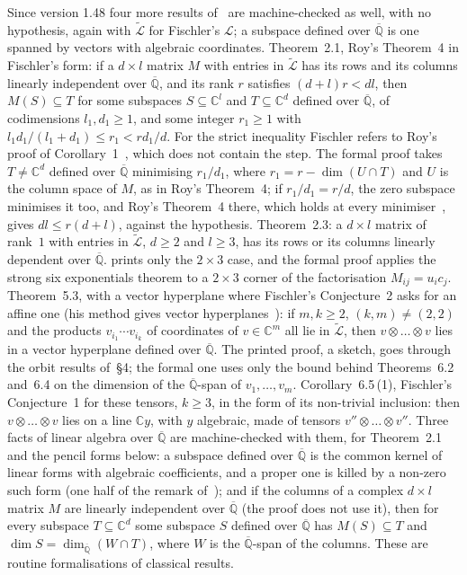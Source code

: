 \documentclass[11pt,a4paper]{article}
\theoremstyle{plain}
\theoremstyle{definition}
\newcommand{\C}{\mathbb{C}}
\newcommand{\Alg}{\overline{\mathbb{Q}}}
\newcommand{\aLogs}{\widetilde{\mathcal{L}}}
\begin{document}
Since version 1.48 four more results of~\cite{fischler-2001} are machine-checked as well, with no hypothesis, again
with $\aLogs$ for Fischler's $\mathcal{L}$; a subspace defined over $\Alg$ is one spanned by vectors with algebraic
coordinates. Theorem~2.1, Roy's Theorem~4 in Fischler's form: if a $d\times l$ matrix $M$ with entries in $\aLogs$
has its rows and its columns linearly independent over $\Alg$, and its rank $r$ satisfies $(d+l)r<dl$, then
$M(S)\subseteq T$ for some subspaces $S\subseteq\C^{l}$ and $T\subseteq\C^{d}$ defined over $\Alg$, of codimensions
$l_{1},d_{1}\geq1$, and some integer $r_{1}\geq1$ with $l_{1}d_{1}/(l_{1}+d_{1})\leq r_{1}<rd_{1}/d$. For the strict
inequality Fischler refers to Roy's proof of Corollary~1~\cite[p.~38]{roy-1992}, which does not contain the step. The
formal proof takes $T\neq\C^{d}$ defined over $\Alg$ minimising $r_{1}/d_{1}$, where $r_{1}=r-\dim(U\cap T)$ and $U$
is the column space of $M$, as in Roy's Theorem~4; if $r_{1}/d_{1}=r/d$, the zero subspace minimises it too, and Roy's
Theorem~4 there, which holds at every minimiser~\cite[p.~34]{roy-1992}, gives $dl\leq r(d+l)$, against the hypothesis.
Theorem~2.3: a $d\times l$ matrix of rank~$1$ with entries in $\aLogs$, $d\geq2$ and $l\geq3$, has its rows or its
columns linearly dependent over $\Alg$. \cite[Corollary~2]{roy-1992} prints only the $2\times3$ case, and the formal
proof applies the strong six exponentials theorem to a $2\times3$ corner of the factorisation $M_{ij}=u_{i}c_{j}$. Theorem~5.3, with a
vector hyperplane where Fischler's Conjecture~2 asks for an affine one (his method gives vector hyperplanes~\cite[p.~169]{fischler-2001}): if
$m,k\geq2$, $(k,m)\neq(2,2)$ and the products $v_{i_{1}}\cdots v_{i_{k}}$ of coordinates of $v\in\C^{m}$ all lie in
$\aLogs$, then $v\otimes\dots\otimes v$ lies in a vector hyperplane defined over $\Alg$. The printed proof, a sketch,
goes through the orbit results of~\S4; the formal one uses only the bound behind Theorems~6.2 and~6.4 on the dimension
of the $\Alg$-span of $v_{1},\dots,v_{m}$. Corollary~6.5\,(1), Fischler's Conjecture~1 for these tensors, $k\geq3$, in
the form of its non-trivial inclusion: then $v\otimes\dots\otimes v$ lies on a line $\C y$, with $y$ algebraic, made
of tensors $v''\otimes\dots\otimes v''$. Three facts of linear algebra over $\Alg$ are machine-checked with them, for
Theorem~2.1 and the pencil forms below: a subspace defined over $\Alg$ is the common kernel of linear forms with
algebraic coefficients, and a proper one is killed by a non-zero such form (one half of the remark
of~\cite[p.~170]{fischler-2001}); and if the columns of a complex $d\times l$ matrix $M$ are linearly independent over
$\Alg$ (the proof does not use it), then for every subspace $T\subseteq\C^{d}$ some subspace $S$ defined over $\Alg$
has $M(S)\subseteq T$ and $\dim S=\dim_{\Alg}(W\cap T)$, where $W$ is the $\Alg$-span of the columns. These are
routine formalisations of classical results.
\end{document}
